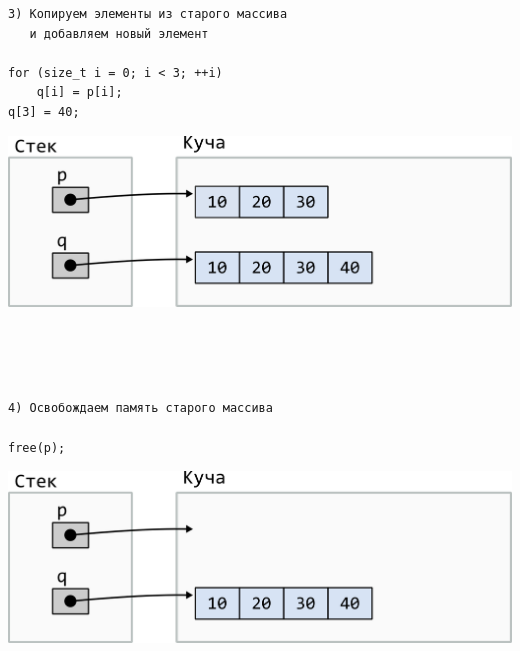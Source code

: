\documentclass[10pt]{article}
\begin{document}
\noindent\begin{minipage}{.45\textwidth}
\begin{lstlisting}
3) Копируем элементы из старого массива
   и добавляем новый элемент
   
for (size_t i = 0; i < 3; ++i)
    q[i] = p[i];
q[3] = 40;
\end{lstlisting}
\end{minipage}
\begin{minipage}{.45\textwidth}
\includegraphics[scale=0.75]{../images/malloc_realocation3.png}
\end{minipage}
\quad\\
\quad\\
\quad\\


\noindent\begin{minipage}{.45\textwidth}
\begin{lstlisting}
4) Освобождаем память старого массива

free(p);
\end{lstlisting}
\end{minipage}
\begin{minipage}{.45\textwidth}
\includegraphics[scale=0.75]{../images/malloc_realocation4.png}
\end{minipage}
\quad\\
\quad\\
\quad\\
\end{document}
